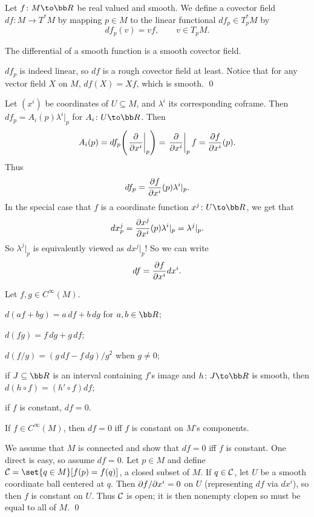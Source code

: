 \bdefn

    Let $f\colon M\to\bR$ be real valued and smooth.
    We define a covector field $df\colon M\to T^*M$ by mapping $p\in M$ to the linear functional $df_p\in T^*_pM$ by
    $$ df_p(v) = vf,\qquad v\in T_pM. $$

\edefn

\bprop

    The differential of a smooth function is a smooth covector field.

\eprop

\bproof

    $df_p$ is indeed linear, so $df$ is a rough covector field at least.
    Notice that for any vector field $X$ on $M$, $df(X)=Xf$, which is smooth.
    \qed

\eproof

Let $(x^i)$ be coordinates of $U\subseteq M$, and $\lambda^i$ its corresponding coframe.
Then $df_p=A_i(p)\lambda^i|_p$ for $A_i\colon U\to\bR$.
Then
$$ A_i(p) = df_p\mathopen{}\mathclose{\left(\left.{{\partial }\over{\partial x^i}}\right|_p\right)} = \left.{{\partial }\over{\partial x^i}}\right|_pf = {{\partial f}\over{\partial x^i}}(p) . $$
Thus
$$ df_p = {{\partial f}\over{\partial x^i}}(p)\lambda^i|_p . $$
In the special case that $f$ is a coordinate function $x^j\colon U\to\bR$, we get that
$$ dx^j_p = {{\partial x^j}\over{\partial x^i}}(p)\lambda^i|_p = \lambda^j|_p . $$
So $\lambda^j|_p$ is equivalently viewed as $dx^j|_p$!
So we can write
$$ df = {{\partial f}\over{\partial x^i}}dx^i . $$

\bprop

    Let $f,g\in C^\infty(M)$.
    \benum
        \item $d(af+bg)=a\,df+b\,dg$ for $a,b\in\bR$;
        \item $d(fg)=f\,dg+g\,df$;
        \item $d(f/g)=(g\,df-f\,dg)/g^2$ when $g\neq0$;
        \item if $J\subseteq\bR$ is an interval containing $f$'s image and $h\colon J\to\bR$ is smooth, then $d(h\circ f)=(h'\circ f)df$;
        \item if $f$ is constant, $df=0$.
    \eenum

\eprop

\bprop

    If $f\in C^\infty(M)$, then $df=0$ iff $f$ is constant on $M$'s components.

\eprop

\bproof

    We assume that $M$ is connected and show that $df=0$ iff $f$ is constant.
    One direct is easy, so assume $df=0$.
    Let $p\in M$ and define $\c C=\set{q\in M}[f(p)=f(q)]$, a closed subset of $M$.
    If $q\in{\cal C}$, let $U$ be a smooth coordinate ball centered at $q$.
    Then $\partial f/\partial x^i=0$ on $U$ (representing $df$ via $dx^i$), so then $f$ is constant on $U$.
    Thus ${\cal C}$ is open; it is then nonempty clopen so must be equal to all of $M$.
    \qed

